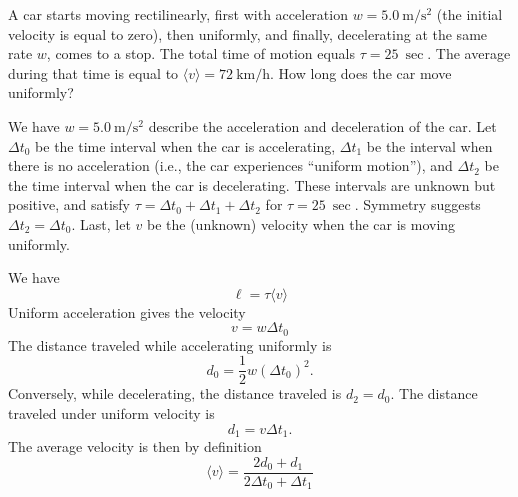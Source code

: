 

\begin{ex}
A car starts moving rectilinearly, first with acceleration
$w=\SI[per-mode=symbol]{5.0}{\meter\per\second\squared}$ (the initial
velocity is equal to zero), then uniformly, and finally, decelerating at
the same rate $w$, comes to a stop. The total time of motion equals
$\tau=\SI{25}{\sec}$. The average during that time is equal to $\langle
v\rangle=\SI[per-mode=symbol]{72}{\kilo\meter\per\hour}$. How long does
the car move uniformly?
\end{ex}
\begin{soln}
\IDENTIFY
We have $w=\SI{5.0}{\meter\per\second\squared}$
describe the acceleration and deceleration of the car. Let $\Delta t_{0}$
be the time interval when the car is accelerating,
$\Delta t_{1}$ be the interval when there is no acceleration (i.e., the
car experiences ``uniform motion''), and $\Delta t_{2}$ be the time
interval when the car is decelerating. These intervals are unknown but
positive, and satisfy $\tau = \Delta t_{0} + \Delta t_{1} + \Delta t_{2}$
for $\tau=\SI{25}{\sec}$.
Symmetry suggests $\Delta t_{2}=\Delta t_{0}$. Last, let $v$ be the
(unknown) velocity when the car is moving uniformly.

\SETUP
We have
\begin{equation}
\ell = \tau \langle v\rangle
\end{equation}
Uniform acceleration gives the velocity
\begin{equation}
v = w\Delta t_{0}
\end{equation}
The distance traveled while accelerating uniformly is
\begin{equation}
d_{0} = \frac{1}{2}w(\Delta t_{0})^{2}.
\end{equation}
Conversely, while decelerating, the distance traveled is $d_{2}=d_{0}$.
The distance traveled under uniform velocity is
\begin{equation}
d_{1} = v\Delta t_{1}.
\end{equation}
The average velocity is then by definition
\begin{equation}\label{eq:ir1.3:def-avg-velocity}
\langle v\rangle = \frac{2d_{0} + d_{1}}{2\Delta t_{0} + \Delta t_{1}}
\end{equation}


\end{soln}

